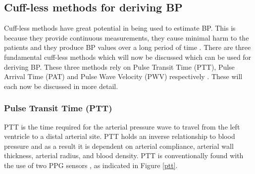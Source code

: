 \documentclass[11pt, a4paper]{article}
\begin{document}
\subsection{Cuff-less methods for deriving BP} Cuff-less  methods have great potential in being used to estimate BP. This is because they provide continuous measurements, they cause minimal harm to the patients and they produce BP values over a long period of time  \cite{Liu2020}. There are three fundamental cuff-less methods which will now be discussed which can be used for deriving BP. These three methods rely on Pulse Transit Time (PTT), Pulse Arrival Time (PAT) and Pulse Wave Velocity (PWV) respectively \cite{Nye2015}. These will each now be discussed in more detail.

\subsubsection{Pulse Transit Time (PTT)} 
PTT is the time required for the arterial pressure wave to travel from the left ventricle to a distal arterial site. PTT holds an inverse relationship to blood pressure and as a result it is dependent on arterial compliance, arterial wall thickness, arterial radius, and blood density. PTT is conventionally found with the use of two PPG sensors \cite{Tanveer2018} \cite{Wang2018} \cite{ElHajj2020}, as indicated in Figure \ref{ptt}.
\end{document}
